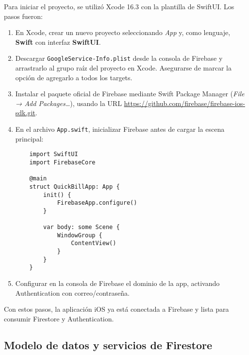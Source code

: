 \begin{large}

Para iniciar el proyecto, se utilizó Xcode 16.3 con la plantilla de SwiftUI. Los pasos fueron:

\begin{enumerate}
  \item En Xcode, crear un nuevo proyecto seleccionando \emph{App} y, como lenguaje, \textbf{Swift} con interfaz \textbf{SwiftUI}.
  \item Descargar \texttt{GoogleService-Info.plist} desde la consola de Firebase y arrastrarlo al grupo raíz del proyecto en Xcode. Asegurarse de marcar la opción de agregarlo a todos los targets.
  \item Instalar el paquete oficial de Firebase mediante Swift Package Manager (\emph{File → Add Packages…}), usando la URL \url{https://github.com/firebase/firebase-ios-sdk.git}.
  \item En el archivo \texttt{App.swift}, inicializar Firebase antes de cargar la escena principal:
    \begin{verbatim}
    import SwiftUI
    import FirebaseCore

    @main
    struct QuickBillApp: App {
        init() {
            FirebaseApp.configure()
        }

        var body: some Scene {
            WindowGroup {
                ContentView()
            }
        }
    }
    \end{verbatim}
  \item Configurar en la consola de Firebase el dominio de la app, activando Authentication con correo/contraseña.
\end{enumerate}

Con estos pasos, la aplicación iOS ya está conectada a Firebase y lista para consumir Firestore y Authentication.

\end{large}

\subsection{Modelo de datos y servicios de Firestore}

